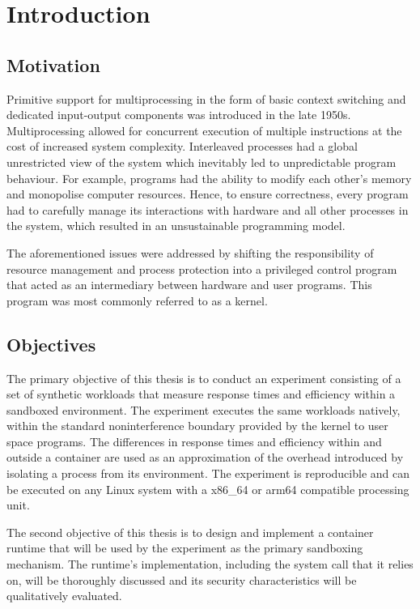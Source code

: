 \chapter{Introduction}
\section{Motivation}
Primitive support for multiprocessing in the form of basic context switching and dedicated input-output 
components was introduced in the late 1950s. Multiprocessing allowed for concurrent execution of 
multiple instructions at the cost of increased system complexity. Interleaved processes had a 
global unrestricted view of the system which inevitably led to unpredictable program behaviour. 
For example, programs had the ability to modify each other's memory and monopolise 
computer resources. Hence, to ensure correctness, every program had to carefully manage its interactions 
with hardware and all other processes in the system, which resulted in an unsustainable 
programming model.

The aforementioned issues were addressed by shifting the responsibility of resource management 
and process protection into a privileged control program that acted as an intermediary between 
hardware and user programs. This program was most commonly referred to as a kernel. 

\section{Objectives}
The primary objective of this thesis is to conduct an experiment consisting of a set of 
synthetic workloads that measure response times and efficiency within a sandboxed environment.
The experiment executes the same workloads natively, within the standard noninterference boundary 
provided by the kernel to user space programs. The differences in response times and efficiency 
within and outside a container are used as an approximation of the overhead introduced 
by isolating a process from its environment. The experiment is reproducible and can be executed 
on any Linux system with a x86\_64 or arm64 compatible processing unit.

The second objective of this thesis is to design and implement a container runtime 
that will be used by the experiment as the primary sandboxing mechanism. The runtime's 
implementation, including the system call that it relies on, will be thoroughly discussed and its security characteristics
will be qualitatively evaluated. 

